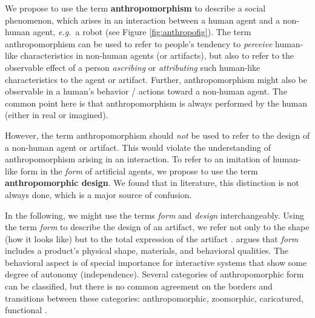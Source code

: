 \documentclass{frontiersSCNS} %
\newcommand{\eg}{{\textit{e.g.~}}}
\begin{document}
We propose to use the term \textbf{anthropomorphism} to describe a social phenomenon, which arises in an interaction between a human agent and a non-human agent, \eg a robot (see Figure \ref{fig:anthropofig}). The term anthropomorphism can be used to refer to people's tendency to \textit{perceive} human-like characteristics in non-human agents (or artifacts), but also to refer to the observable effect of a person \textit{ascribing} or \textit{attributing} such human-like characteristics to the agent or artifact. Further, anthropomorphism might also be observable in a human's behavior / actions toward a non-human agent. The common point here is that anthropomorphism is always performed by the human (either in real or imagined).

However, the term anthropomorphism should \textit{not} be used to refer to the design of a non-human agent or artifact. This would violate the understanding of anthropomorphism arising in an interaction. To refer to an imitation of human-like form in the \textit{form} of artificial agents, we propose to use the term  \textbf{anthropomorphic design}. We found that in literature, this distinction is not always done, which is a major source of confusion. 

In the following, we might use the terms \textit{form} and \textit{design} interchangeably. Using the term \textit{form} to describe the design of an artifact, we refer 
not only to the shape (how it looks like) but to the total 
expression of the artifact \citep{bartneck_shaping_2004}. \cite{disalvo_hug:_2003} 
argues that \textit{form} includes a product's physical shape, materials, and 
behavioral qualities. The behavioral aspect is of special importance for interactive 
systems that show some degree of autonomy (independence).
Several categories of anthropomorphic form can be classified, but there is no 
common agreement on the borders and transitions between these categories: 
anthropomorphic, zoomorphic, caricatured, functional \citep{fong_survey_2003}.
\end{document}
